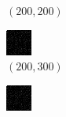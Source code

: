 \documentclass[a4paper, landscape]{article}
\begin{document}
\begin{figure}[H]
\begin{subfigure}{0.07\linewidth}
        \caption*{$(200, 200)$}
    \end{subfigure}
    \begin{subfigure}{0.07\linewidth}
        \centering
        \includegraphics[width=\linewidth]{iht/k = 200, m = 300.png}
        \caption*{$(200, 300)$}
    \end{subfigure}
    \begin{subfigure}{0.07\linewidth}
        \centering
        \includegraphics[width=\linewidth]{iht/k = 200, m = 400.png}

\end{subfigure}
\end{figure}
\end{document}
